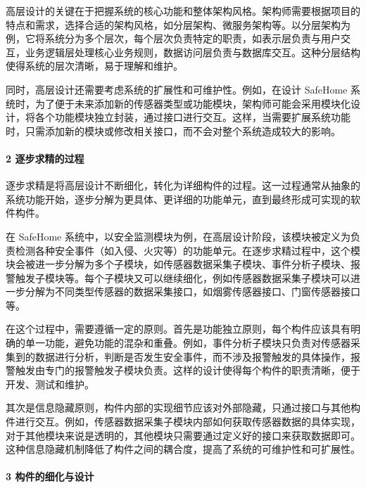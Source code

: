 高层设计的关键在于把握系统的核心功能和整体架构风格。架构师需要根据项目的特点和需求，选择合适的架构风格，如分层架构、微服务架构等。以分层架构为例，它将系统分为多个层次，每个层次负责特定的职责，如表示层负责与用户交互，业务逻辑层处理核心业务规则，数据访问层负责与数据库交互。这种分层结构使得系统的层次清晰，易于理解和维护。

同时，高层设计还需要考虑系统的扩展性和可维护性。例如，在设计 SafeHome 系统时，为了便于未来添加新的传感器类型或功能模块，架构师可能会采用模块化设计，将各个功能模块独立封装，通过接口进行交互。这样，当需要扩展系统功能时，只需添加新的模块或修改相关接口，而不会对整个系统造成较大的影响。

\hypertarget{ux9010ux6b65ux6c42ux7cbeux7684ux8fc7ux7a0b}{%
\paragraph{2 逐步求精的过程}\label{ux9010ux6b65ux6c42ux7cbeux7684ux8fc7ux7a0b}}

逐步求精是将高层设计不断细化，转化为详细构件的过程。这一过程通常从抽象的系统功能开始，逐步分解为更具体、更详细的功能单元，直到最终形成可实现的软件构件。

在 SafeHome 系统中，以安全监测模块为例，在高层设计阶段，该模块被定义为负责检测各种安全事件（如入侵、火灾等）的功能单元。在逐步求精过程中，这个模块会被进一步分解为多个子模块，如传感器数据采集子模块、事件分析子模块、报警触发子模块等。每个子模块又可以继续细化，例如传感器数据采集子模块可以进一步分解为不同类型传感器的数据采集接口，如烟雾传感器接口、门窗传感器接口等。

在这个过程中，需要遵循一定的原则。首先是功能独立原则，每个构件应该具有明确的单一功能，避免功能的混杂和重叠。例如，事件分析子模块只负责对传感器采集到的数据进行分析，判断是否发生安全事件，而不涉及报警触发的具体操作，报警触发由专门的报警触发子模块负责。这样的设计使得每个构件的职责清晰，便于开发、测试和维护。

其次是信息隐藏原则，构件内部的实现细节应该对外部隐藏，只通过接口与其他构件进行交互。例如，传感器数据采集子模块内部如何获取传感器数据的具体实现，对于其他模块来说是透明的，其他模块只需要通过定义好的接口来获取数据即可。这种信息隐藏机制降低了构件之间的耦合度，提高了系统的可维护性和可扩展性。

\hypertarget{ux6784ux4ef6ux7684ux7ec6ux5316ux4e0eux8bbeux8ba1}{%
\paragraph{3 构件的细化与设计}\label{ux6784ux4ef6ux7684ux7ec6ux5316ux4e0eux8bbeux8ba1}}

